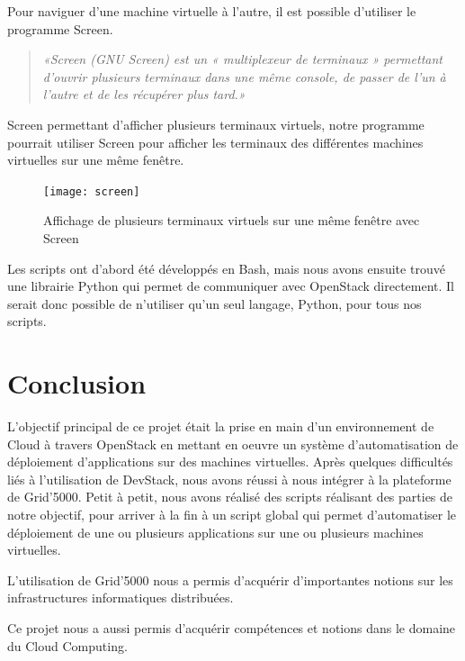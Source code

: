 \documentclass{report}
\begin{document}
    Pour naviguer d'une machine virtuelle à l'autre, il est possible d'utiliser le programme Screen.
    \begin{quote}
        \textit{«Screen (GNU Screen) est un « multiplexeur de terminaux » permettant d'ouvrir plusieurs terminaux dans une même console, de passer de l'un à l'autre et de les récupérer plus tard.» \cite{Screen}}
    \end{quote}
    Screen permettant d'afficher plusieurs terminaux virtuels, notre programme pourrait utiliser Screen pour afficher les terminaux des différentes machines virtuelles sur une même fenêtre.\bigbreak
    \begin{figure}[H]
        \centering{}\texttt{[image: screen]}
        \caption{Affichage de plusieurs terminaux virtuels sur une même fenêtre avec Screen \cite{imageScreen}} 
        \label{screen}
        \hspace{\linewidth}
    \end{figure}
    Les scripts ont d'abord été développés en Bash, mais nous avons ensuite trouvé une librairie Python qui permet de communiquer avec OpenStack directement. Il serait donc possible de n'utiliser qu'un seul langage, Python, pour tous nos scripts.


\newpage
\chapter{Conclusion}
    L'objectif principal de ce projet était la prise en main d'un environnement de Cloud à travers OpenStack en mettant en oeuvre un système d'automatisation de déploiement d'applications sur des machines virtuelles.
    \bigbreak
    Après quelques difficultés liés à l'utilisation de DevStack, nous avons réussi à nous intégrer à la plateforme de Grid'5000. Petit à petit, nous avons réalisé des scripts réalisant des parties de notre objectif, pour arriver à la fin à un script global qui permet d'automatiser le déploiement de une ou plusieurs applications sur une ou plusieurs machines virtuelles.
    \bigbreak
    
    L'utilisation de Grid'5000 nous a permis d'acquérir d'importantes notions sur les infrastructures informatiques distribuées.
    \bigbreak
    
    Ce projet nous a aussi permis d'acquérir compétences et notions dans le domaine du Cloud Computing. %
    
\end{document}
